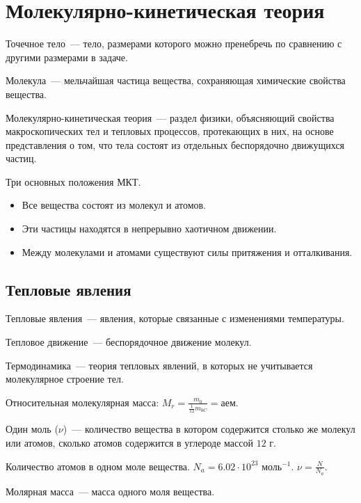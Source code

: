 \documentclass[12pt]{article}
\begin{document}
	\section{Молекулярно-кинетическая теория}
	\begin{definition}
		Точечное тело~--- тело, размерами которого можно пренебречь по сравнению с другими размерами в задаче.
	\end{definition}
	\begin{definition}
		Молекула~--- мельчайшая частица вещества, сохраняющая химические свойства вещества.
	\end{definition}
	\begin{definition}
		Молекулярно-кинетическая теория~--- раздел физики, объясняющий свойства макроскопических тел и тепловых процессов, протекающих в них, на основе представления о том, что тела состоят из отдельных беспорядочно движущихся частиц.
	\end{definition}
	\begin{definition}
		Три основных положения МКТ.
		\begin{itemize}
			\item Все вещества состоят из молекул и атомов.
			\item Эти частицы находятся в непрерывно хаотичном движении.
			\item Между молекулами и атомами существуют силы притяжения и отталкивания.
		\end{itemize}
	\end{definition}
	\subsection{Тепловые явления}
	\begin{definition}
		Тепловые явления~--- явления, которые связанные с изменениями температуры.
	\end{definition}
	\begin{definition}
		Тепловое движение~--- беспорядочное движение молекул.
	\end{definition}
	\begin{definition}
		Термодинамика~--- теория тепловых явлений, в которых не учитывается молекулярное строение тел.
	\end{definition}
	\begin{definition}
		Относительная молекулярная масса: $M_r = \frac{m_0}{\frac{1}{12} m_{0C}} = \text{аем}$.
	\end{definition}
	\begin{definition}
		Один моль ($\nu$)~--- количество вещества в котором содержится столько же молекул или атомов, сколько атомов содержится в углероде массой $12$ г.
	\end{definition}
	\begin{definition}
		Количество атомов в одном моле вещества. $N_a = 6.02 \cdot 10^{23} \text{ моль}^{-1}$. $\nu = \frac{N}{N_a}$.
	\end{definition}
	\begin{definition}
		Молярная масса~--- масса одного моля вещества.
	\end{definition}
\end{document}
